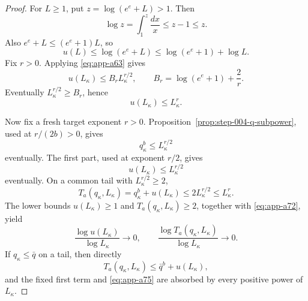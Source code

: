 \begin{proof}
For \(L\geq1\), put \(z=\log(e^e+L)>1\).  Then
\[
\log z=\int_1^z\frac{dx}{x}\leq z-1\leq z.
\]
Also \(e^e+L\leq(e^e+1)L\), so
\begin{equation}
u(L)
\leq\log(e^e+L)
\leq\log(e^e+1)+\log L.
\label{eq:app-a73}
\end{equation}
Fix \(r>0\).  Applying \eqref{eq:app-a63} gives
\begin{equation}
u(L_\kappa)
\leq B_rL_\kappa^{r/2},
\qquad
B_r=\log(e^e+1)+\frac2r.
\label{eq:app-a74}
\end{equation}
Eventually \(L_\kappa^{r/2}\geq B_r\), hence
\begin{equation}
u(L_\kappa)\leq L_\kappa^r.
\label{eq:app-a75}
\end{equation}

Now fix a fresh target exponent \(r>0\).
Proposition~\ref{prop:step-004-q-subpower}, used at
\(r/(2b)>0\), gives
\begin{equation}
q_\kappa^b\leq L_\kappa^{r/2}
\label{eq:app-a76}
\end{equation}
eventually.  The first part, used at exponent \(r/2\), gives
\begin{equation}
u(L_\kappa)\leq L_\kappa^{r/2}
\label{eq:app-a77}
\end{equation}
eventually.  On a common tail with \(L_\kappa^{r/2}\geq2\),
\begin{equation}
T_a(q_\kappa,L_\kappa)
=q_\kappa^b+u(L_\kappa)
\leq2L_\kappa^{r/2}
\leq L_\kappa^r.
\label{eq:app-a78}
\end{equation}
The lower bounds \(u(L_\kappa)\geq1\) and
\(T_a(q_\kappa,L_\kappa)\geq2\), together with \eqref{eq:app-a72}, yield
\begin{equation}
\frac{\log u(L_\kappa)}{\log L_\kappa}\to0,\qquad
\frac{\log T_a(q_\kappa,L_\kappa)}{\log L_\kappa}\to0.
\label{eq:app-a79}
\end{equation}
If \(q_\kappa\leq\bar q\) on a tail, then directly
\begin{equation}
T_a(q_\kappa,L_\kappa)
\leq\bar q^b+u(L_\kappa),
\label{eq:app-a80}
\end{equation}
and the fixed first term and \eqref{eq:app-a75} are absorbed by every positive
power of \(L_\kappa\).
\end{proof}

